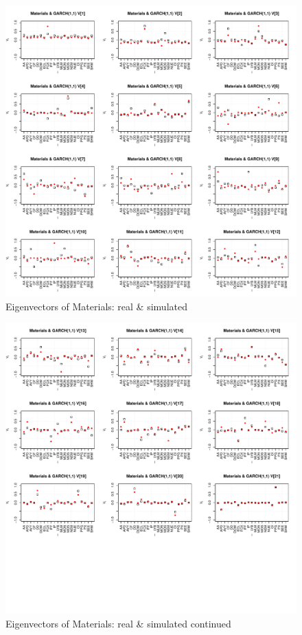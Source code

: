 \documentclass{article}
\begin{document}
\begin{figure}[htb!]
  \centering
  \includegraphics[scale=0.5]{Materials_eigenvectors1.pdf}
  \caption{Eigenvectors of Materials: real \& simulated}
  \label{fig:Materials_eigenvectors1}
\end{figure}

\begin{figure}[htb!]
  \centering
  \includegraphics[scale=0.5]{Materials_eigenvectors2.pdf}
  \caption{Eigenvectors of Materials: real \& simulated continued}
  \label{fig:Materials_eigenvectors2}
\end{figure}



\end{document}
